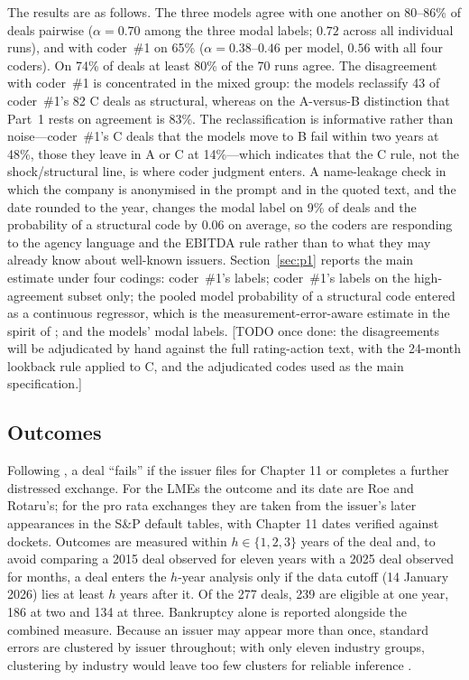 \documentclass[12pt]{article}
\begin{document}
The results are as follows. The three models agree with one another on 80--86\% of deals pairwise ($\alpha = 0.70$ among the three modal labels; $0.72$ across all individual runs), and with coder~\#1 on 65\% ($\alpha = 0.38$--$0.46$ per model, $0.56$ with all four coders). On 74\% of deals at least 80\% of the 70 runs agree. The disagreement with coder~\#1 is concentrated in the mixed group: the models reclassify 43 of coder~\#1's 82 C deals as structural, whereas on the A-versus-B distinction that Part~1 rests on agreement is 83\%. The reclassification is informative rather than noise---coder~\#1's C deals that the models move to B fail within two years at 48\%, those they leave in A or C at 14\%---which indicates that the C rule, not the shock/structural line, is where coder judgment enters. A name-leakage check in which the company is anonymised in the prompt and in the quoted text, and the date rounded to the year, changes the modal label on 9\% of deals and the probability of a structural code by 0.06 on average, so the coders are responding to the agency language and the EBITDA rule rather than to what they may already know about well-known issuers. Section~\ref{sec:p1} reports the main estimate under four codings: coder~\#1's labels; coder~\#1's labels on the high-agreement subset only; the pooled model probability of a structural code entered as a continuous regressor, which is the measurement-error-aware estimate in the spirit of \citet{egami2023}; and the models' modal labels. [TODO once done: the disagreements will be adjudicated by hand against the full rating-action text, with the 24-month lookback rule applied to C, and the adjudicated codes used as the main specification.]

\subsection{Outcomes}

Following \citet{roerotaru2026}, a deal ``fails'' if the issuer files for Chapter 11 or completes a further distressed exchange. For the LMEs the outcome and its date are Roe and Rotaru's; for the pro rata exchanges they are taken from the issuer's later appearances in the S\&P default tables, with Chapter 11 dates verified against dockets. Outcomes are measured within $h \in \{1, 2, 3\}$ years of the deal and, to avoid comparing a 2015 deal observed for eleven years with a 2025 deal observed for months, a deal enters the $h$-year analysis only if the data cutoff (14 January 2026) lies at least $h$ years after it. Of the 277 deals, 239 are eligible at one year, 186 at two and 134 at three. Bankruptcy alone is reported alongside the combined measure. Because an issuer may appear more than once, standard errors are clustered by issuer throughout; with only eleven industry groups, clustering by industry would leave too few clusters for reliable inference \citep{cameron2015}.
\end{document}
